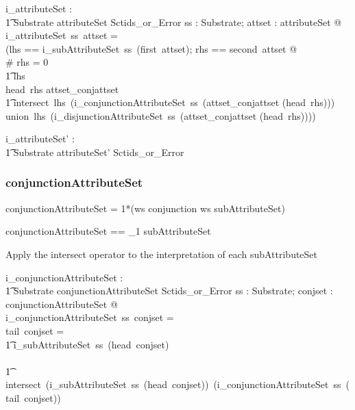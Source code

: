 \documentclass{article}
\def\bnf#1{{\scriptsize {{#1}} }}
\begin{document}
\begin{gendef}
   i\_attributeSet : \\
\t1 Substrate \fun attributeSet \fun Sctids\_or\_Error
\where
   \forall ss : Substrate; attset : attributeSet @ \\
   i\_attributeSet~ss~attset = \\
   (\LET lhs == i\_subAttributeSet~ss~(first~attset); rhs == second~attset @ \\
 \IF \# rhs = 0 \\
\t1 \THEN lhs \\
 \ELSE \IF head~rhs \in \ran attset\_conjattset \\
\t1 \THEN intersect~lhs~(i\_conjunctionAttributeSet~ss~(attset\_conjattset \inv (head~rhs))) \\
  \ELSE union~lhs~(i\_disjunctionAttributeSet~ss~(attset\_conjattset \inv (head~rhs))))
\end{gendef}

\begin{gendef}
   i\_attributeSet' : \\
\t1 Substrate \fun attributeSet' \fun Sctids\_or\_Error
\end{gendef}

\subsubsection{conjunctionAttributeSet}
\begin{framed}
\noindent
\bnf{conjunctionAttributeSet = 1*(ws conjunction ws subAttributeSet)}
\end{framed}

\begin{zed}
conjunctionAttributeSet ==  \seq_1 subAttributeSet 
\end{zed}


Apply the intersect operator to the interpretation of each  subAttributeSet

\begin{gendef}
    i\_conjunctionAttributeSet : \\
\t1 Substrate \fun conjunctionAttributeSet \fun Sctids\_or\_Error
\where
   \forall ss : Substrate;  conjset : conjunctionAttributeSet @ \\
   i\_conjunctionAttributeSet~ss~conjset = ~ \\
   \IF tail~conjset = \langle \rangle \\
\t1 \THEN i\_subAttributeSet~ss~(head~conjset) \\
\ELSE \\
\t1 intersect~(i\_subAttributeSet~ss~(head~conjset))~(i\_conjunctionAttributeSet~ss~(tail~conjset))
\end{gendef}
\end{document}
